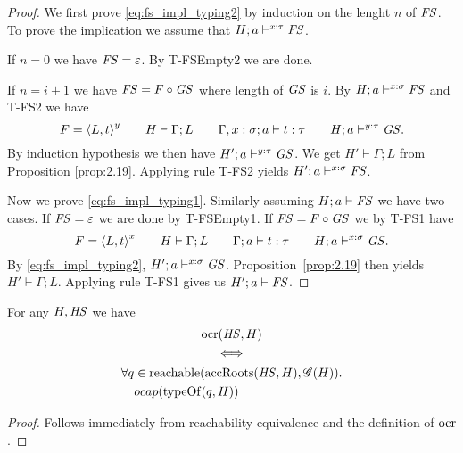 \begin{proof}
  We first prove \eqref{eq:fs_impl_typing2} by induction on the lenght $n$ of
  $\mathit{FS}$. To prove the implication we assume that $H; a \vdash^{x: \tau} \mathit{FS}$.
  
  If $n = 0$ we have $\mathit{FS} = \varepsilon$. By {\sc T-FSEmpty2} we are done.
  
  If $n = i + 1$ we have $\mathit{FS} = F \circ \mathit{GS}$ where length of $\mathit{GS}$ is $i$. By  
  $H; a \vdash^{x: \sigma} \mathit{FS}$ and {\sc T-FS2} we have 
  \begin{equation*}
    F = \mbox{$\langle L, t \rangle$}^{y} \quad\quad H \vdash \Gamma; L \quad\quad \mbox{$\Gamma, x:
    \sigma;a\vdash t:\tau$} \quad\quad H; a \vdash^{y: \tau} \mathit{GS}.
  \end{equation*}
  By induction hypothesis we then have $H'; a \vdash^{y: \tau} \mathit{GS}$. We get $H'
  \vdash \Gamma; L$ from Proposition \ref{prop:2.19}. Applying rule {\sc T-FS2}
  yields $H'; a \vdash^{x: \sigma} \mathit{FS}$.

  Now we prove \eqref{eq:fs_impl_typing1}. Similarly assuming $H; a \vdash \mathit{FS}$
  we have two cases. If $\mathit{FS} = \varepsilon$ we are done by {\sc T-FSEmpty1}. If
  $\mathit{FS} = F \circ \mathit{GS}$ we by {\sc T-FS1} have
  \begin{equation*}
    F = \mbox{$\langle L, t \rangle$}^{x} \quad\quad H \vdash \Gamma; L \quad\quad
    \mbox{$\Gamma;a\vdash t:\tau$} \quad\quad H; a \vdash^{x: \sigma} \mathit{GS}.
  \end{equation*}
  By \eqref{eq:fs_impl_typing2}, $H'; a \vdash^{x: \sigma} \mathit{GS}$. 
  Proposition~\ref{prop:2.19} then yields $H' \vdash \Gamma; L$. Applying rule {\sc
  T-FS1} gives us $H'; a \vdash \mathit{FS}$.
\end{proof}

\begin{proposition} \label{prop:ocrloc_eq}
  For any $H, \mathit{HS}$ we have
  \begin{equation*}
    \begin{gathered}
      \mbox{$\mathrm{ocr}$}(\mathit{HS}, H) \\
      \iff  \\
      \begin{aligned}
        \forall q &\in \mbox{$\mathrm{reachable}$}(\mbox{$\mathrm{accRoots}$}(\mathit{HS}, H), \mathscr{G}(H)). \\
        & \mbox{$ocap$}(\mbox{$\mathrm{typeOf}$}(q, H))
      \end{aligned}
    \end{gathered}
  \end{equation*}
\end{proposition}
\begin{proof}
  Follows immediately from reachability equivalence and the definition of
  $\mbox{$\mathrm{ocr}$}$.
\end{proof}


